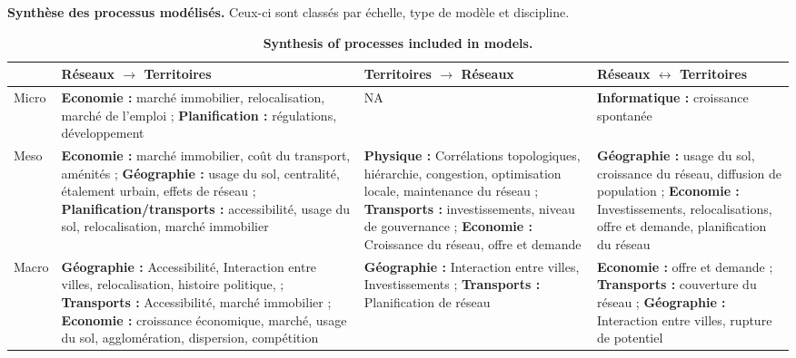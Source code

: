 \begin{table}%
\caption{\textbf{Synthesis of processes included in models.}\label{tab:modelography:processes}}{\textbf{Synthèse des processus modélisés.} Ceux-ci sont classés par échelle, type de modèle et discipline. \label{tab:modelography:processes}}
\begin{tabular}{|l|p{5.5cm}|p{5.5cm}|p{5.5cm}|}
\hline
 & Réseaux $\rightarrow$ Territoires & Territoires $\rightarrow$ Réseaux & Réseaux $\leftrightarrow$ Territoires\\ \hline
Micro & \textbf{Economie : } marché immobilier, relocalisation, marché de l'emploi ; \textbf{Planification : } régulations, développement & NA & \textbf{Informatique : } croissance spontanée \\ \hline
Meso & \textbf{Economie : } marché immobilier, coût du transport, aménités ; \textbf{Géographie : } usage du sol, centralité, étalement urbain, effets de réseau ; \textbf{Planification/transports : } accessibilité, usage du sol, relocalisation, marché immobilier  & \textbf{Physique : } Corrélations topologiques, hiérarchie, congestion, optimisation locale, maintenance du réseau ; \textbf{Transports : } investissements, niveau de gouvernance ; \textbf{Economie : } Croissance du réseau, offre et demande & \textbf{Géographie : } usage du sol, croissance du réseau, diffusion de population ; \textbf{Economie : } Investissements, relocalisations, offre et demande, planification du réseau\\ \hline
Macro & \textbf{Géographie : } Accessibilité, Interaction entre villes, relocalisation, histoire politique,  ; \textbf{Transports : } Accessibilité, marché immobilier ; \textbf{Economie : } croissance économique, marché, usage du sol, agglomération, dispersion, compétition  & \textbf{Géographie : } Interaction entre villes, Investissements ; \textbf{Transports : } Planification de réseau & \textbf{Economie : } offre et demande ; \textbf{Transports : } couverture du réseau ; \textbf{Géographie : } Interaction entre villes, rupture de potentiel\\ \hline
\end{tabular}
\end{table}


